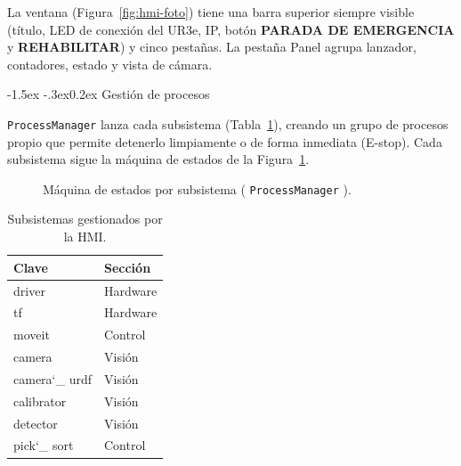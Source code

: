 \documentclass[12pt,a4paper]{article}
\makeatletter
\renewcommand\subsubsection{\@startsection{subsubsection}{3}{\z@}%
  {-1.5ex \@plus -.3ex}{0.2ex}%
  {\normalsize\bfseries\color{MediumBlue}}}
\newcommand{\code}[1]{%
  \begingroup
  \def\_{\char`_\penalty0 }%
  \def\/{\char`/\penalty0 }%
  \texttt{\small #1}%
  \endgroup}
\makeatother
\begin{document}
La ventana (Figura~\ref{fig:hmi-foto}) tiene una barra superior siempre
visible (título, LED de conexión del UR3e, IP, botón \textbf{PARADA DE
EMERGENCIA} y \textbf{REHABILITAR}) y cinco pestañas. La pestaña Panel
agrupa lanzador, contadores, estado y vista de cámara.

\subsubsection{Gestión de procesos}

\code{ProcessManager} lanza cada subsistema (Tabla~\ref{tab:subsistemas}), creando un grupo de procesos
propio que permite detenerlo limpiamente
o de forma inmediata (E-stop). Cada subsistema sigue la máquina de estados de la
Figura~\ref{fig:fsm}.

\begin{figure}[H]
\centering
{}
\caption{Máquina de estados por subsistema (\code{ProcessManager}).}
\label{fig:fsm}
\end{figure}

\begin{table}[H]
\centering
\caption{Subsistemas gestionados por la HMI.}
\label{tab:subsistemas}
\small
\begin{tabular}{l l}
\toprule
\textbf{Clave} & \textbf{Sección}\\
\midrule
driver & Hardware\\
tf & Hardware\\
moveit & Control\\
camera & Visión\\
camera\_urdf & Visión\\
calibrator & Visión\\
detector & Visión\\
pick\_sort & Control\\
\bottomrule
\end{tabular}
\end{table}
\end{document}
